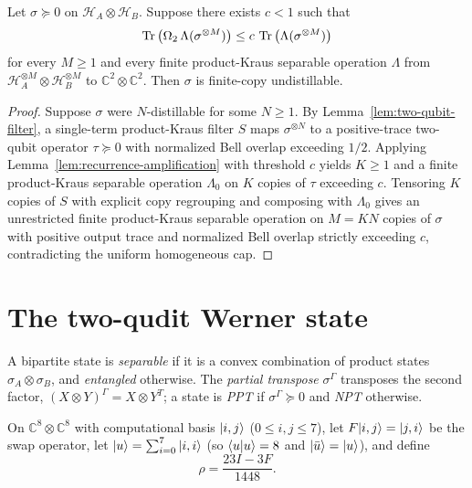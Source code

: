 \begin{theorem}
\label{thm:cap-undistillable}
\leanok
{}
Let $\sigma\succeq 0$ on $\mathcal{H}_A\otimes\mathcal{H}_B$. Suppose there exists $c < 1$ such that
\[
  \operatorname{Tr}\big(\Omega_2\,\Lambda(\sigma^{\otimes M})\big)
  \le c\,\operatorname{Tr}\big(\Lambda(\sigma^{\otimes M})\big)
\]
for every $M\ge 1$ and every finite product-Kraus separable operation $\Lambda$ from $\mathcal{H}_A^{\otimes M}\otimes\mathcal{H}_B^{\otimes M}$ to $\mathbb{C}^2\otimes\mathbb{C}^2$. Then $\sigma$ is finite-copy undistillable.
\end{theorem}
\begin{proof}
\leanok
Suppose $\sigma$ were $N$-distillable for some $N\ge 1$. By Lemma~\ref{lem:two-qubit-filter}, a single-term product-Kraus filter $S$ maps $\sigma^{\otimes N}$ to a positive-trace two-qubit operator $\tau\succeq 0$ with normalized Bell overlap exceeding $1/2$. Applying Lemma~\ref{lem:recurrence-amplification} with threshold $c$ yields $K\ge 1$ and a finite product-Kraus separable operation $\Lambda_0$ on $K$ copies of $\tau$ exceeding $c$. Tensoring $K$ copies of $S$ with explicit copy regrouping and composing with $\Lambda_0$ gives an unrestricted finite product-Kraus separable operation on $M = KN$ copies of $\sigma$ with positive output trace and normalized Bell overlap strictly exceeding $c$, contradicting the uniform homogeneous cap.
\end{proof}

\section{The two-qudit Werner state}

A bipartite state is \emph{separable} if it is a convex combination of product states $\sigma_A\otimes\sigma_B$, and \emph{entangled} otherwise. The \emph{partial transpose} $\sigma^{\Gamma}$ transposes the second factor, $(X\otimes Y)^{\Gamma}=X\otimes Y^T$; a state is \emph{PPT} if $\sigma^{\Gamma}\succeq 0$ and \emph{NPT} otherwise.

On $\mathbb{C}^8\otimes\mathbb{C}^8$ with computational basis $|i,j\rangle$ ($0\le i,j\le 7$), let $F|i,j\rangle=|j,i\rangle$ be the swap operator, let $|u\rangle=\sum_{i=0}^{7}|i,i\rangle$ (so $\langle u|u\rangle=8$ and $|\bar{u}\rangle=|u\rangle$), and define
\[
  \rho = \frac{23I - 3F}{1448}.
\]

